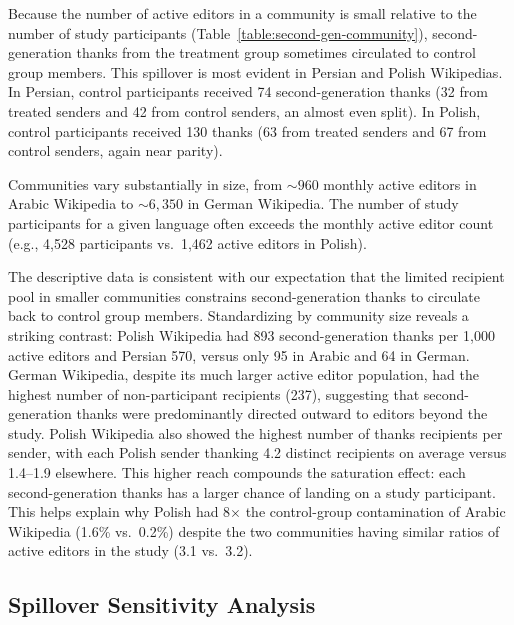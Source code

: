 \documentclass[9pt,twoside,lineno]{pnas-new}
\begin{document}
Because the number of active editors in a community is small relative to the number of study participants (Table~\ref{table:second-gen-community}), second-generation thanks from the treatment group sometimes circulated to control group members. This spillover is most evident in Persian and Polish Wikipedias. In Persian, control participants received 74 second-generation thanks (32 from treated senders and 42 from control senders, an almost even split). In Polish, control participants received 130 thanks (63 from treated senders and 67 from control senders, again near parity).

Communities vary substantially in size, from ${\sim}960$ monthly active editors in Arabic Wikipedia to ${\sim}6{,}350$ in German Wikipedia. The number of study participants for a given language often exceeds the monthly active editor count (e.g., 4{,}528 participants vs.\ 1{,}462 active editors in Polish).


The descriptive data is consistent with our expectation that the limited recipient pool in smaller communities constrains second-generation thanks to circulate back to control group members. Standardizing by community size reveals a striking contrast: Polish Wikipedia had 893 second-generation thanks per 1{,}000 active editors and Persian 570, versus only 95 in Arabic and 64 in German. German Wikipedia, despite its much larger active editor population, had the highest number of non-participant recipients (237), suggesting that second-generation thanks were predominantly directed outward to editors beyond the study. Polish Wikipedia also showed the highest number of thanks recipients per sender, with each Polish sender thanking 4.2 distinct recipients on average versus 1.4--1.9 elsewhere. This higher reach compounds the saturation effect: each second-generation thanks has a larger chance of landing on a study participant. This helps explain why Polish had 8$\times$ the control-group contamination of Arabic Wikipedia (1.6\% vs.\ 0.2\%) despite the two communities having similar ratios of active editors in the study (3.1 vs.\ 3.2).

\subsection*{Spillover Sensitivity Analysis}
\end{document}
